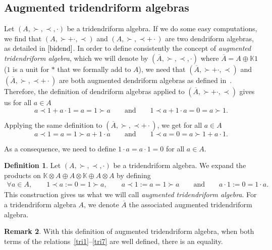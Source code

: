 \documentclass[pdftex]{sigma}
\numberwithin{equation}{section}
\theoremstyle{definition}
\newtheorem{defi}{Definition}[section]
\newtheorem{Rq}[defi]{Remark}
\theoremstyle{plain}
\newcommand{\K}{\mathbb{K}}
\begin{document}
\subsection{Augmented tridendriform algebras }\label{sec:Aug}
Let $(A,\succ, \prec, \cdot)$ be a tridendriform algebra. If we do some easy computations, we find that $(A,\succ +\cdot, \prec)$ and $(A,\succ, \prec +\cdot)$ are two dendriform algebras, as detailed in $\cite{bidend}$.
In order to define consistently the concept of \emph{augmented tridendriform algebra}, which we will denote by $(\overline{A},\succ,\prec,\cdot)$ where $\overline{A}=A\oplus \K1$ ($1$ is a unit for $*$ that we formally add to $A$), we need that $(\overline{A},\succ +\cdot, \prec)$ and $(\overline{A},\succ, \prec +\cdot)$ are both augmented dendriform algebras as defined in~\cite[Section~3.1]{Augm}.
Therefore, the definition of dendriform algebras applied to $(\overline{A},\succ +\cdot, \prec)$ gives us for all $a\in A$
\begin{equation*}
	a\prec 1+ a\cdot 1=a=1\succ a \qquad \text{and} \qquad 1\prec a + 1 \cdot a=0=a\succ 1.
\end{equation*}

Applying the same definition to $(\overline{A},\succ, \prec+\cdot)$, we get for all $a\in A$
\begin{equation*}
a\prec 1 =a=1\succ a+1\cdot a \qquad \text{and} \qquad 1\prec a =0=a\succ 1+a\cdot 1.
\end{equation*}

As a consequence, we need to define $1\cdot a=a\cdot 1=0$ for all $a\in A$.

\begin{defi}
	Let $(A,\succ,\prec,\cdot)$ be a tridendriform algebra. We expand the products on \linebreak$\K\otimes A\oplus A\otimes \K \oplus A\otimes A$ by defining
	\begin{gather}\label{def:augment}
		\forall a\in A, \!\qquad 1\prec a :=0=1\succ a, \!\qquad a\prec 1:=a=1\succ a \!\qquad \text{and} \!\qquad a\cdot 1:=0=1\cdot a.
	\end{gather}
	This construction gives us what we will call \emph{augmented tridendriform algebra}. For a tridendriform algebra $A$, we denote $\overline{A}$ the associated augmented tridendriform algebra.
\end{defi}

\begin{Rq}\label{Rq:relations+}
	With this definition of augmented tridendriform algebra, when both terms of the relations~\eqref{tri1}--\eqref{tri7} are well defined, there is an equality.
\end{Rq}
\end{document}
